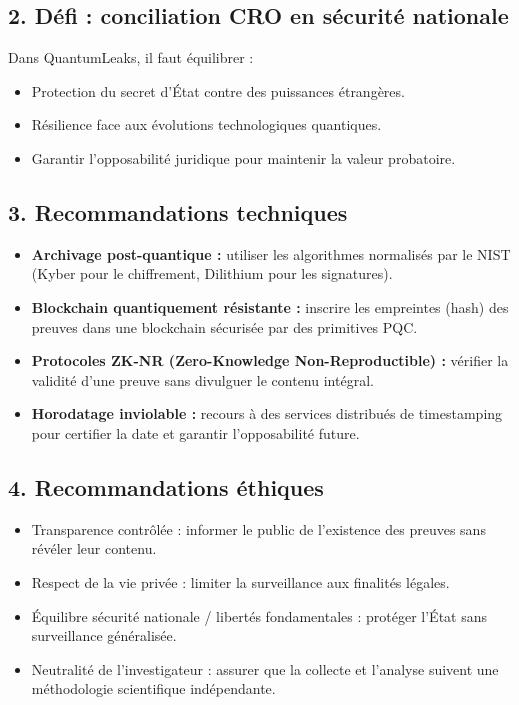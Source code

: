 \documentclass[12pt,a4paper]{report}
\begin{document}
{	
	\subsection*{2. Défi : conciliation CRO en sécurité nationale}
	Dans QuantumLeaks, il faut équilibrer :
	\begin{itemize}
		\item Protection du secret d'État contre des puissances étrangères.
		\item Résilience face aux évolutions technologiques quantiques.
		\item Garantir l’opposabilité juridique pour maintenir la valeur probatoire.
	\end{itemize}
	
	
	\subsection*{3. Recommandations techniques}
	\begin{itemize}
		\item \textbf{Archivage post-quantique :} utiliser les algorithmes normalisés par le NIST (Kyber pour le chiffrement, Dilithium pour les signatures).
		\item \textbf{Blockchain quantiquement résistante :} inscrire les empreintes (hash) des preuves dans une blockchain sécurisée par des primitives PQC.
		\item \textbf{Protocoles ZK-NR (Zero-Knowledge Non-Reproductible) :} vérifier la validité d’une preuve sans divulguer le contenu intégral.
		\item \textbf{Horodatage inviolable :} recours à des services distribués de timestamping pour certifier la date et garantir l’opposabilité future.
	\end{itemize}
	
	
	\subsection*{4. Recommandations éthiques}
	\begin{itemize}
		\item Transparence contrôlée : informer le public de l’existence des preuves sans révéler leur contenu.
		\item Respect de la vie privée : limiter la surveillance aux finalités légales.
		\item Équilibre sécurité nationale / libertés fondamentales : protéger l’État sans surveillance généralisée.
		\item Neutralité de l’investigateur : assurer que la collecte et l’analyse suivent une méthodologie scientifique indépendante.
	\end{itemize}
	
}
\end{document}
